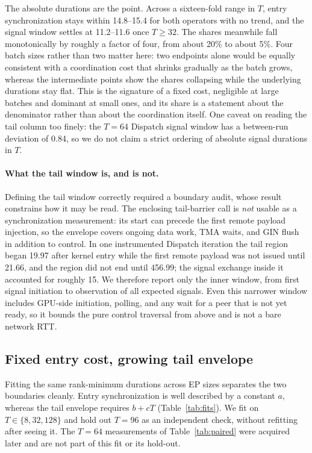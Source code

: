 The absolute durations are the point. Across a sixteen-fold range in $T$, entry
synchronization stays within 14.8--15.4\us{} for both operators with no trend, and the
signal window settles at 11.2--11.6\us{} once $T \geq 32$. The shares meanwhile fall
monotonically by roughly a factor of four, from about 20\% to about 5\%. Four batch
sizes rather than two matter here: two endpoints alone would be equally consistent with
a coordination cost that shrinks gradually as the batch grows, whereas the intermediate
points show the shares collapsing while the underlying durations stay flat. This is the
signature of a fixed cost, negligible at large batches and dominant at small ones, and
its share is a statement about the denominator rather than about the coordination
itself. One caveat on reading the tail column too finely: the $T=64$ Dispatch signal
window has a between-run deviation of 0.84\us{}, so we do not claim a strict ordering
of absolute signal durations in $T$.

\paragraph{What the tail window is, and is not.} Defining the tail window correctly
required a boundary audit, whose result constrains how it may be read. The enclosing
tail-barrier call is \emph{not} usable as a synchronization measurement: its start can
precede the first remote payload injection, so the envelope covers ongoing data work,
TMA waits, and GIN flush in addition to control. In one instrumented Dispatch
iteration the tail region began 19.97\us{} after kernel entry while the first remote
payload was not issued until 21.66\us{}, and the region did not end until 456.99\us{};
the signal exchange inside it accounted for roughly 15\us{}. We therefore report only
the inner window, from first signal initiation to observation of all expected signals.
Even this narrower window includes GPU-side initiation, polling, and any wait for a
peer that is not yet ready, so it bounds the pure control traversal from above and is
not a bare network RTT.

\subsection{Fixed entry cost, growing tail envelope}
\label{sec:fits}
Fitting the same rank-minimum durations across EP sizes separates the two boundaries
cleanly. Entry synchronization is well described by a constant $a$, whereas the tail
envelope requires $b + cT$ (Table~\ref{tab:fits}). We fit on $T \in \{8, 32, 128\}$ and
hold out $T=96$ as an independent check, without refitting after seeing it. The $T=64$
measurements of Table~\ref{tab:paired} were acquired later and are not part of this fit
or its hold-out.

